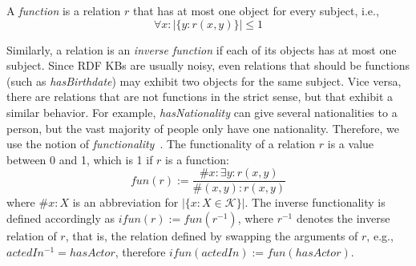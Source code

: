 
A \emph{function} is a relation $r$ that has at most one object for every subject, i.e.,
\[
 \forall x: |\{y: r(x,y)\}| \leq 1
\]

Similarly, a relation is an \emph{inverse function} if each of its objects has at most one subject. 
Since RDF KBs are usually noisy, even relations that should be functions (such as \emph{has\-Birthdate}) may exhibit two objects for the same subject.
Vice versa, there are relations that are not functions in the strict sense, but that exhibit a similar behavior.
For example, \emph{has\-Nationality} can give several nationalities to a person, but the vast majority of people only have one nationality.
Therefore, we use the notion of \emph{functionality}~\cite{paris}. The functionality of a relation $r$ is a value between 0 and 1, which is 1 if $r$ is a function:
\[fun(r) := \frac{\#x: \exists y: r(x,y)}{\#(x,y): r(x,y)}\]
where  $\#x:X$ is an abbreviation for $|\{x: X \in \mathcal{K}\}|$.
The inverse functionality is defined accordingly as $ifun(r):=fun(r^{-1})$, where $r^{-1}$ denotes
the inverse relation of $r$, that is, the relation defined by swapping the arguments of $r$, e.g.,
$actedIn^{-1} = hasActor$, therefore $ifun(actedIn):= fun(hasActor)$.


